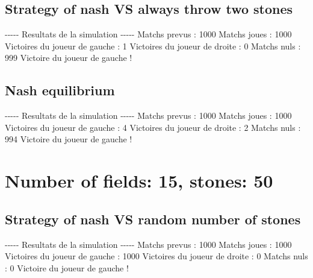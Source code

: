 \documentclass{article}%
\begin{document}
%
\subsection{Strategy of nash VS always throw two stones}%
\label{subsec:Strategy of nash VS always throw two stones}%
{-}{-}{-}{-}{-} Resultats de la simulation {-}{-}{-}{-}{-}\newline%
		\newline%
Matchs prevus : 1000\newline%
Matchs joues : 1000\newline%
\newline%
Victoires du joueur de gauche : 1\newline%
Victoires du joueur de droite : 0\newline%
Matchs nuls : 999\newline%
\newline%
Victoire du joueur de gauche !

%
\subsection{Nash equilibrium}%
\label{subsec:Nash equilibrium}%
{-}{-}{-}{-}{-} Resultats de la simulation {-}{-}{-}{-}{-}\newline%
		\newline%
Matchs prevus : 1000\newline%
Matchs joues : 1000\newline%
\newline%
Victoires du joueur de gauche : 4\newline%
Victoires du joueur de droite : 2\newline%
Matchs nuls : 994\newline%
\newline%
Victoire du joueur de gauche !

%
\section{Number of fields: 15, stones: 50}%
\label{sec:Number of fields 15, stones 50}%
\subsection{Strategy of nash VS random number of stones}%
\label{subsec:Strategy of nash VS random number of stones}%
{-}{-}{-}{-}{-} Resultats de la simulation {-}{-}{-}{-}{-}\newline%
		\newline%
Matchs prevus : 1000\newline%
Matchs joues : 1000\newline%
\newline%
Victoires du joueur de gauche : 1000\newline%
Victoires du joueur de droite : 0\newline%
Matchs nuls : 0\newline%
\newline%
Victoire du joueur de gauche !
\end{document}
